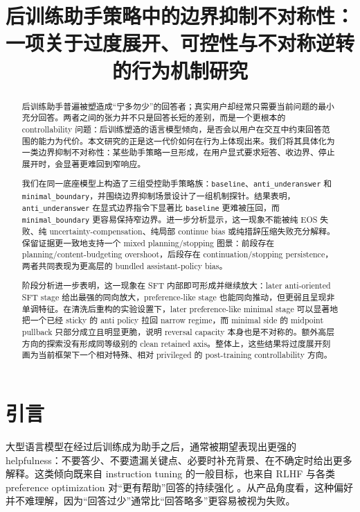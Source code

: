 \documentclass[12pt]{ctexart}
\title{后训练助手策略中的边界抑制不对称性：\\
一项关于过度展开、可控性与不对称逆转的行为机制研究}
\author{}
\date{}
\begin{document}
\maketitle

\begin{abstract}
后训练助手普遍被塑造成“宁多勿少”的回答者；真实用户却经常只需要当前问题的最小充分回答。两者之间的张力并不只是回答长短的差别，而是一个更根本的 controllability 问题：后训练塑造的语言模型倾向，是否会以用户在交互中约束回答范围的能力为代价。本文研究的正是这一代价如何在行为上体现出来。我们将其具体化为一类边界抑制不对称性：某些助手策略一旦形成，在用户显式要求短答、收边界、停止展开时，会显著更难回到窄响应。

我们在同一底座模型上构造了三组受控助手策略族：\texttt{baseline}、\texttt{anti\_underanswer} 和 \texttt{minimal\_boundary}，并围绕边界抑制场景设计了一组机制探针。结果表明，\texttt{anti\_underanswer} 在显式边界指令下显著比 \texttt{baseline} 更难被压回，而 \texttt{minimal\_boundary} 更容易保持窄边界。进一步分析显示，这一现象不能被纯 EOS 失败、纯 uncertainty-compensation、纯局部 continue bias 或纯措辞压缩失败充分解释。保留证据更一致地支持一个 mixed planning/stopping 图景：前段存在 planning/content-budgeting overshoot，后段存在 continuation/stopping persistence，两者共同表现为更高层的 bundled assistant-policy bias。

阶段分析进一步表明，这一现象在 SFT 内部即可形成并继续放大：later anti-oriented SFT stage 给出最强的同向放大，preference-like stage 也能同向推动，但更弱且呈现非单调特征。在清洗后重构的实验设置下，later preference-like minimal stage 可以显著地把一个已经 sticky 的 anti policy 拉回 narrow regime，而 minimal side 的 midpoint pullback 只部分成立且明显更脆，说明 reversal capacity 本身也是不对称的。额外高层方向的探索没有形成同等级别的 clean retained axis。整体上，这些结果将过度展开刻画为当前框架下一个相对特殊、相对 privileged 的 post-training controllability 方向。
\end{abstract}

\section{引言}

大型语言模型在经过后训练成为助手之后，通常被期望表现出更强的 helpfulness：不要答少、不要遗漏关键点、必要时补充背景、在不确定时给出更多解释。这类倾向既来自 instruction tuning 的一般目标，也来自 RLHF 与各类 preference optimization 对“更有帮助”回答的持续强化 \citep{brown2020gpt3,wei2021flan,sanh2021t0,mishra2021naturalinstructions,wang2022selfinstruct,ouyang2022instructgpt,bai2022hh,bai2022constitutional}。从产品角度看，这种偏好并不难理解，因为“回答过少”通常比“回答略多”更容易被视为失败。
\end{document}
